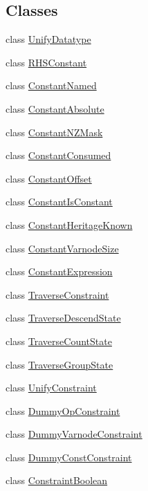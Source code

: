 \subsection*{Classes}
\begin{DoxyCompactItemize}
\item 
class \mbox{\hyperlink{class_unify_datatype}{Unify\+Datatype}}
\item 
class \mbox{\hyperlink{class_r_h_s_constant}{R\+H\+S\+Constant}}
\item 
class \mbox{\hyperlink{class_constant_named}{Constant\+Named}}
\item 
class \mbox{\hyperlink{class_constant_absolute}{Constant\+Absolute}}
\item 
class \mbox{\hyperlink{class_constant_n_z_mask}{Constant\+N\+Z\+Mask}}
\item 
class \mbox{\hyperlink{class_constant_consumed}{Constant\+Consumed}}
\item 
class \mbox{\hyperlink{class_constant_offset}{Constant\+Offset}}
\item 
class \mbox{\hyperlink{class_constant_is_constant}{Constant\+Is\+Constant}}
\item 
class \mbox{\hyperlink{class_constant_heritage_known}{Constant\+Heritage\+Known}}
\item 
class \mbox{\hyperlink{class_constant_varnode_size}{Constant\+Varnode\+Size}}
\item 
class \mbox{\hyperlink{class_constant_expression}{Constant\+Expression}}
\item 
class \mbox{\hyperlink{class_traverse_constraint}{Traverse\+Constraint}}
\item 
class \mbox{\hyperlink{class_traverse_descend_state}{Traverse\+Descend\+State}}
\item 
class \mbox{\hyperlink{class_traverse_count_state}{Traverse\+Count\+State}}
\item 
class \mbox{\hyperlink{class_traverse_group_state}{Traverse\+Group\+State}}
\item 
class \mbox{\hyperlink{class_unify_constraint}{Unify\+Constraint}}
\item 
class \mbox{\hyperlink{class_dummy_op_constraint}{Dummy\+Op\+Constraint}}
\item 
class \mbox{\hyperlink{class_dummy_varnode_constraint}{Dummy\+Varnode\+Constraint}}
\item 
class \mbox{\hyperlink{class_dummy_const_constraint}{Dummy\+Const\+Constraint}}
\item 
class \mbox{\hyperlink{class_constraint_boolean}{Constraint\+Boolean}}

\end{DoxyCompactItemize}

